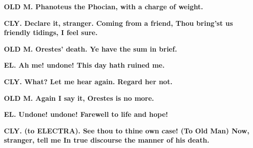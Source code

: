 \documentclass[11pt,letter]{book}
\begin{document}
\par \textbf{OLD M. Phanoteus the Phocian, with a charge of weight.}
\par 

\par \textbf{CLY. Declare it, stranger. Coming from a friend, Thou bring’st us friendly tidings, I feel sure.}
\par 

\par \textbf{OLD M. Orestes’ death. Ye have the sum in brief.}
\par 

\par \textbf{EL. Ah me! undone! This day hath ruined me.}
\par 

\par \textbf{CLY. What? Let me hear again. Regard her not.}
\par 

\par \textbf{OLD M. Again I say it, Orestes is no more.}
\par 

\par \textbf{EL. Undone! undone! Farewell to life and hope!}
\par 

\par \textbf{CLY. (to ELECTRA). See thou to thine own case! (To Old Man) Now, stranger, tell me In true discourse the manner of his death.}
\par 
\end{document}
